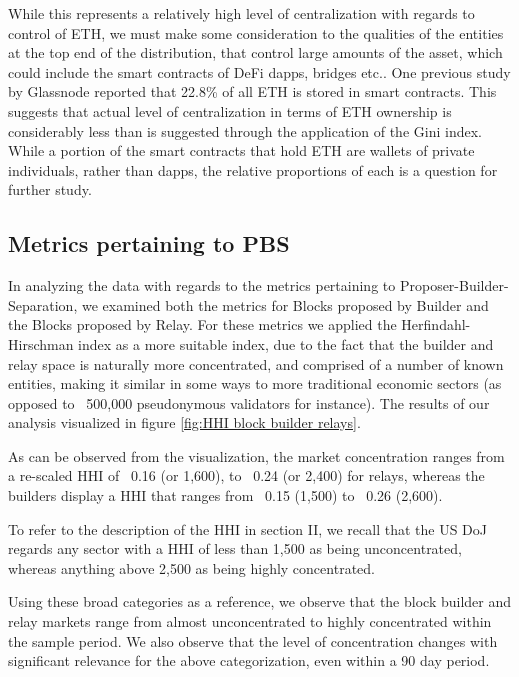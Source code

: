 \documentclass[conference]{IEEEtran}
\begin{document}
While this represents a relatively high level of centralization with regards to control of ETH, we must make some consideration to the qualities of the entities at the top end of the distribution, that control large amounts of the asset, which could include the smart contracts of DeFi dapps, bridges etc..  One previous study by Glassnode \cite{checkmate2021} reported that 22.8\% of all ETH is stored in smart contracts.  This suggests that actual level of centralization in terms of ETH ownership is considerably less than is suggested through the  application of the Gini index.  While a portion of the smart contracts that hold ETH are wallets of private individuals, rather than dapps, the relative proportions of each is a question for further study.

\subsection{Metrics pertaining to PBS}

In analyzing the data with regards to the metrics pertaining to Proposer-Builder-Separation, we examined both the metrics for Blocks proposed by Builder and the Blocks proposed by Relay.  For these metrics we applied the Herfindahl-Hirschman index as a more suitable index, due to the fact that the builder and relay space is naturally more concentrated, and comprised of a number of known entities, making it similar in some ways to more traditional economic sectors (as opposed to ~500,000 pseudonymous validators for instance).  The results of our analysis visualized in figure \ref{fig:HHI block builder relays}.

As can be observed from the visualization, the market concentration ranges from a re-scaled HHI of ~0.16 (or 1,600), to ~0.24 (or 2,400) for relays, whereas the builders display a HHI that ranges from ~0.15 (1,500) to ~0.26 (2,600).

To refer to the description of the HHI in section II, we recall that the US DoJ regards any sector with a HHI of less than 1,500 as being unconcentrated, whereas anything above 2,500 as being highly concentrated. 

Using these broad categories as a reference, we observe that the block builder and relay markets range from almost unconcentrated to highly concentrated within the sample period.  We also observe that the level of concentration changes with significant relevance for the above categorization, even within a 90 day period.
\end{document}
